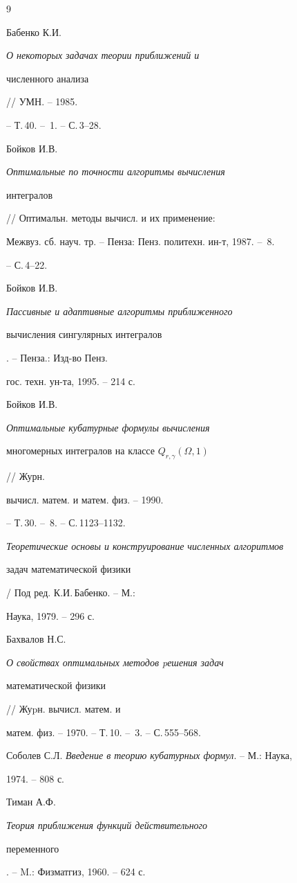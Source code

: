 \begin{thebibliography}{9}







Бабенко К.И. {\em О некоторых задачах теории приближений и


численного анализа} // УМН. -- 1985.


-- Т.\,40. -- \No\,1. -- С.\,3--28.




Бойков И.В. {\em Оптимальные по точности алгоритмы вычисления


интегралов} // Оптимальн. методы вычисл. и их применение:


Межвуз. сб. науч. тр. -- Пенза: Пенз. политехн. ин-т, 1987. -- \No\,8.


-- С.\,4--22.




Бойков И.В. {\em Пассивные и адаптивные алгоритмы приближенного


вычисления сингулярных интегралов}. -- Пенза.: Изд-во Пенз.


гос. техн. ун-та, 1995. -- 214 с.




Бойков И.В. {\em Оптимальные кубатурные формулы вычисления


многомерных интегралов на классе $Q_{r,\gamma} (\Omega,1)$} // Журн.


вычисл. матем. и матем. физ. -- 1990.


-- Т.\,30. -- \No\,8. -- С.\,1123--1132.




{\em Теоретические основы и конструирование численных алгоритмов


задач математической физики} / Под ред. К.И.\,Бабенко. -- М.:


Наука, 1979. -- 296 с.




Бахвалов Н.С. {\em О свойствах оптимальных методов pешения задач 


математической физики} // Жуpн. вычисл. матем. и


матем. физ. -- 1970. -- Т.\,10. -- \No\,3. -- С.\,555--568.




Соболев С.Л. {\em Введение в теорию кубатурных формул}. -- М.: Наука,


1974. -- 808 с.




Тиман А.Ф. {\em Теория приближения функций действительного


переменного}. -- M.: Физматгиз, 1960. -- 624 с.





\end{thebibliography}





\vskip 2cm












\label{end}





